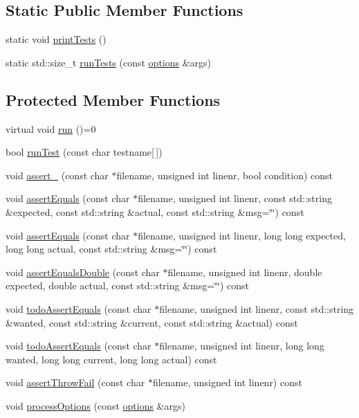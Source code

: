\subsection*{Static Public Member Functions}
\begin{DoxyCompactItemize}
\item 
static void \hyperlink{class_test_fixture_a565fb2deaf56d065bd6c7b696fea678b}{print\-Tests} ()
\item 
static std\-::size\-\_\-t \hyperlink{class_test_fixture_a753bccbb52392df45eb8195e4552fb73}{run\-Tests} (const \hyperlink{classoptions}{options} \&args)
\end{DoxyCompactItemize}
\subsection*{Protected Member Functions}
\begin{DoxyCompactItemize}
\item 
virtual void \hyperlink{class_test_fixture_a41cfa790a452f03d4fb8d849fc47e686}{run} ()=0
\item 
bool \hyperlink{class_test_fixture_ad90383f58a2a4f0cfec62fe308918394}{run\-Test} (const char testname\mbox{[}$\,$\mbox{]})
\item 
void \hyperlink{class_test_fixture_a7ecdedb84aed49cffc0c36aa1fb22719}{assert\-\_\-} (const char $\ast$filename, unsigned int linenr, bool condition) const 
\item 
void \hyperlink{class_test_fixture_a73430ba861d494553667db6f27e045f6}{assert\-Equals} (const char $\ast$filename, unsigned int linenr, const std\-::string \&expected, const std\-::string \&actual, const std\-::string \&msg=\char`\"{}\char`\"{}) const 
\item 
void \hyperlink{class_test_fixture_a7756e6a7bf785a2b340df7ae44e96bc7}{assert\-Equals} (const char $\ast$filename, unsigned int linenr, long long expected, long long actual, const std\-::string \&msg=\char`\"{}\char`\"{}) const 
\item 
void \hyperlink{class_test_fixture_ac9eeb9162db2ed08a188ccd8ef9e2ffb}{assert\-Equals\-Double} (const char $\ast$filename, unsigned int linenr, double expected, double actual, const std\-::string \&msg=\char`\"{}\char`\"{}) const 
\item 
void \hyperlink{class_test_fixture_a599ae05e660867eff2de2bf37d9201cc}{todo\-Assert\-Equals} (const char $\ast$filename, unsigned int linenr, const std\-::string \&wanted, const std\-::string \&current, const std\-::string \&actual) const 
\item 
void \hyperlink{class_test_fixture_afea92302ef3b7d604f01709e8fc79aa6}{todo\-Assert\-Equals} (const char $\ast$filename, unsigned int linenr, long long wanted, long long current, long long actual) const 
\item 
void \hyperlink{class_test_fixture_aed1572869c4a6d3713df09c674503ef1}{assert\-Throw\-Fail} (const char $\ast$filename, unsigned int linenr) const 
\item 
void \hyperlink{class_test_fixture_aa4887d40b17d3cedece05aeeec3fdd71}{process\-Options} (const \hyperlink{classoptions}{options} \&args)
\end{DoxyCompactItemize}
